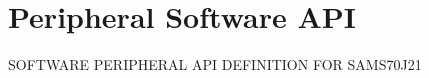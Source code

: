 \hypertarget{group__SAMS70J21__api}{}\section{Peripheral Software A\+PI}
\label{group__SAMS70J21__api}
S\+O\+F\+T\+W\+A\+RE P\+E\+R\+I\+P\+H\+E\+R\+AL A\+PI D\+E\+F\+I\+N\+I\+T\+I\+ON F\+OR S\+A\+M\+S70\+J21 